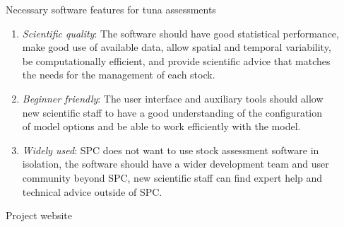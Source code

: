 \documentclass[aspectratio=169,fleqn]{beamer}
\begin{document}
\begin{frame}{Necessary software features for tuna assessments}\small
  \\[1ex]
  \begin{enumerate}
    \item \textit{Scientific quality}:
    The software should have good statistical performance,\\
    make good use of available data, allow spatial and temporal variability,\\
    be computationally efficient, and provide scientific advice that matches\\
    the needs for the management of each stock.\\[2.5ex]
    \item \textit{Beginner friendly}:
    The user interface and auxiliary tools should allow\\
    new scientific staff to have a good understanding of the configuration\\
    of model options and be able to work efficiently with the model.\\[2.5ex]
    \item \textit{Widely used}:
    SPC does not want to use stock assessment software in\\
    isolation, the software should have a wider development team and user\\
    community beyond SPC, new scientific staff can find expert help and\\
    technical advice outside of SPC.\\[2.5ex]
  \end{enumerate}
\end{frame}


\begin{frame}{Project website}
  \centering\small
\end{frame}
\end{document}
